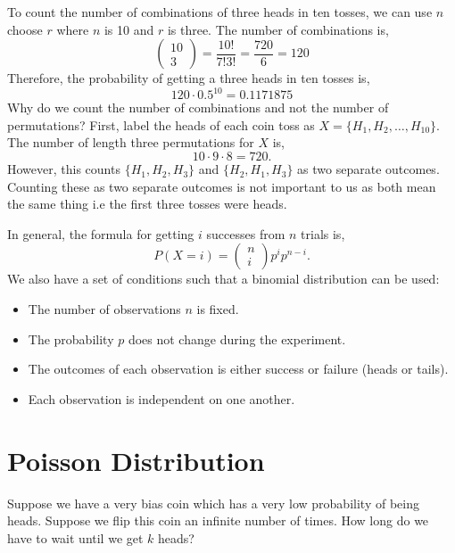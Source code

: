 \documentclass{article}
\begin{document}
To count the number of combinations of three heads in ten tosses, we can use $n$ choose $r$ where $n$ is 10 and $r$ is three. The number of combinations is,
$$
    \begin{pmatrix}10 \\ 3\end{pmatrix} = \frac{10!}{7!3!} = \frac{720}{6} = 120
$$
Therefore, the probability of getting a three heads in ten tosses is,
$$
    120 \cdot 0.5 ^ {10} = 0.1171875
$$
Why do we count the number of combinations and not the number of permutations? First, label the heads of each coin toss as $X = \{ H_1, H_2, \dots, H_{10} \}$. The number of length three permutations for $X$ is,
$$
    10 \cdot 9 \cdot 8 = 720.
$$
However, this counts $\{ H_1, H_2, H_3 \}$ and $\{ H_2, H_1, H_3 \}$ as two separate outcomes. Counting these as two separate outcomes is not important to us as both mean the same thing i.e the first three tosses were heads.

In general, the formula for getting $i$ successes from $n$ trials is,
$$
    P(X = i) = \begin{pmatrix} n \\ i \end{pmatrix} p ^ {i} p ^ {n - i}.
$$
We also have a set of conditions such that a binomial distribution can be used:
\begin{itemize}
    \item The number of observations $n$ is fixed.
    \item The probability $p$ does not change during the experiment.
    \item The outcomes of each observation is either success or failure (heads or tails).
    \item Each observation is independent on one another.
\end{itemize}

\section{Poisson Distribution}

Suppose we have a very bias coin which has a very low probability of being heads. Suppose we flip this coin an infinite number of times. How long do we have to wait until we get $k$ heads?
\end{document}
